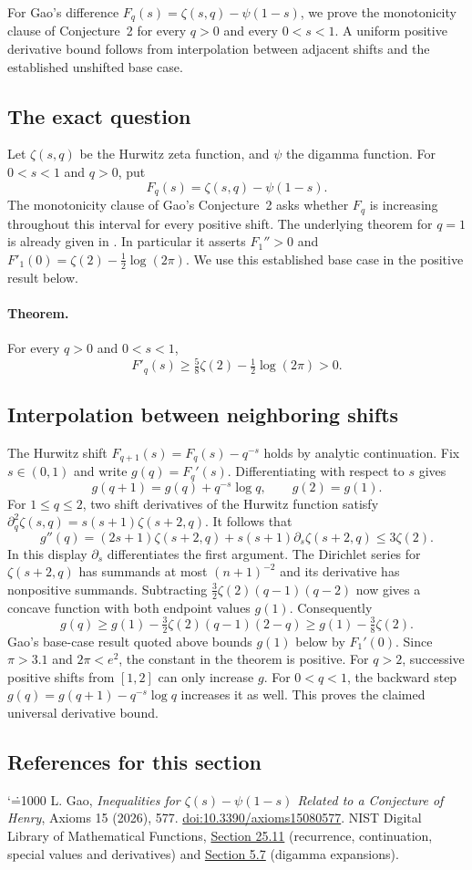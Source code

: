 \documentclass[11pt,a4paper]{article}
\makeatletter
\numberwithin{equation}{section}
\theoremstyle{definition}
\theoremstyle{remark}
\newenvironment{sectionabstract}{\par\smallskip\begingroup\small\noindent}{\par\endgroup\medskip}
\renewenvironment{thebibliography}[1]
 {\subsection*{References for this section}\small
  \list{\@biblabel{\@arabic\c@enumiv}}
       {\settowidth\labelwidth{\@biblabel{#1}}\leftmargin\labelwidth
        \advance\leftmargin\labelsep\@openbib@code
        \usecounter{enumiv}\let\p@enumiv\@empty
        \renewcommand\theenumiv{\@arabic\c@enumiv}}
  \sloppy\clubpenalty4000\widowpenalty4000\sfcode`\.=1000\relax}
 {\def\@noitemerr{\@latex@warning{Empty bibliography}}\endlist}
\makeatother
\begin{document}
\begin{sectionabstract}
For Gao's difference $F_q(s)=\zeta(s,q)-\psi(1-s)$, we prove the monotonicity clause of Conjecture~2 for every $q>0$ and every $0<s<1$. A uniform positive derivative bound follows from interpolation between adjacent shifts and the established unshifted base case.
\end{sectionabstract}
\subsection{The exact question}
Let $\zeta(s,q)$ be the Hurwitz zeta function, and $\psi$ the digamma function. For $0<s<1$ and $q>0$, put
\[
 F_q(s)=\zeta(s,q)-\psi(1-s).
\]
The monotonicity clause of Gao's Conjecture~2 \cite{r30meiji:G} asks whether
$F_q$ is increasing throughout this interval for every positive shift.
The underlying theorem for $q=1$ is already given in \cite{r30meiji:G}. In particular it asserts $F_1''>0$ and $F'_1(0)=\zeta(2)-\tfrac12\log(2\pi)$. We use this established base case in the positive result below.
\paragraph{Theorem.} For every $q>0$ and $0<s<1$,
\[
 F'_q(s)\ge\tfrac58\zeta(2)-\tfrac12\log(2\pi)>0.
\]

\subsection{Interpolation between neighboring shifts}
The Hurwitz shift $F_{q+1}(s)=F_q(s)-q^{-s}$ holds by analytic continuation. Fix $s\in(0,1)$ and write $g(q)=F_q'(s)$. Differentiating with respect to $s$ gives
\[
 g(q+1)=g(q)+q^{-s}\log q,\qquad g(2)=g(1).
\]
For $1\le q\le2$, two shift derivatives of the Hurwitz function satisfy $\partial_q^2\zeta(s,q)=s(s+1)\zeta(s+2,q)$. It follows that
\[
 g''(q)=(2s+1)\zeta(s+2,q)+s(s+1)\partial_s\zeta(s+2,q)
 \le 3\zeta(2).
\]
In this display $\partial_s$ differentiates the first argument. The Dirichlet series for $\zeta(s+2,q)$ has summands at most $(n+1)^{-2}$ and its derivative has nonpositive summands. Subtracting $\tfrac32\zeta(2)(q-1)(q-2)$ now gives a concave function with both endpoint values $g(1)$. Consequently
\[
 g(q)\ge g(1)-\tfrac32\zeta(2)(q-1)(2-q)
       \ge g(1)-\tfrac38\zeta(2).
\]
Gao's base-case result quoted above bounds $g(1)$ below by $F_1'(0)$. Since $\pi>3.1$ and $2\pi<e^2$, the constant in the theorem is positive. For $q>2$, successive positive shifts from $[1,2]$ can only increase $g$. For $0<q<1$, the backward step $g(q)=g(q+1)-q^{-s}\log q$ increases it as well. This proves the claimed universal derivative bound.
\begin{thebibliography}{9}
 L. Gao, \emph{Inequalities for $\zeta(s)-\psi(1-s)$ Related to a Conjecture of Henry}, Axioms 15 (2026), 577. \href{https://doi.org/10.3390/axioms15080577}{doi:10.3390/axioms15080577}.
 NIST Digital Library of Mathematical Functions, \href{https://dlmf.nist.gov/25.11}{Section 25.11} (recurrence, continuation, special values and derivatives) and \href{https://dlmf.nist.gov/5.7}{Section 5.7} (digamma expansions).
\end{thebibliography}
\end{document}

